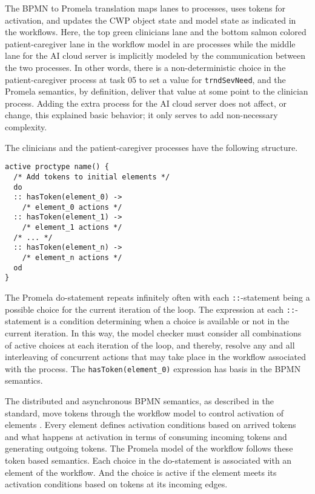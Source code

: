 The BPMN to Promela translation maps lanes to processes, uses tokens for activation, and updates the CWP object state and model state as indicated in the workflows.
Here, the top green clinicians lane and the bottom salmon colored patient-caregiver lane in the workflow model in  are processes while the middle lane for the AI cloud server is implicitly modeled by the communication between the two processes.
In other words, there is a non-deterministic choice in the patient-caregiver process at task 05 to set a value for \texttt{trndSevNeed}, and the Promela semantics, by definition, deliver that value at some point to the clinician process.
Adding the extra process for the AI cloud server does not affect, or change, this explained basic behavior;
it only serves to add non-necessary complexity.

The clinicians and the patient-caregiver processes have the following structure.
%
{\small
\begin{lstlisting}[style=myPromela]
active proctype name() {
  /* Add tokens to initial elements */
  do
  :: hasToken(element_0) ->
    /* element_0 actions */
  :: hasToken(element_1) ->
    /* element_1 actions */
  /* ... */  
  :: hasToken(element_n) ->
    /* element_n actions */
  od
}
\end{lstlisting}
}
%
\noindent The Promela do-statement repeats infinitely often with each \texttt{::}-statement being a possible choice for the current iteration of the loop.
The expression at each \texttt{::}-statement is a condition determining when a choice is available or not in the current iteration.
In this way, the model checker must consider all combinations of active choices at each iteration of the loop, and thereby, resolve any and all interleaving of concurrent actions that may take place in the workflow associated with the process.
The \texttt{hasToken(element\_0)} expression has basis in the BPMN semantics.

The distributed and asynchronous BPMN semantics, as described in the standard, move tokens through the workflow model to control activation of elements \cite{BPMNSpecification}.
Every element defines activation conditions based on arrived tokens and what happens at activation in terms of consuming incoming tokens and generating outgoing tokens.
The Promela model of the workflow follows these token based semantics.
Each choice in the do-statement is associated with an element of the workflow.
And the choice is active if the element meets its activation conditions based on tokens at its incoming edges.

